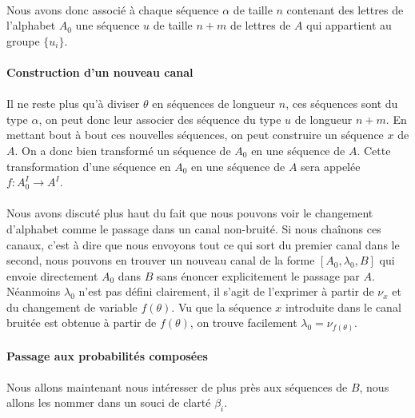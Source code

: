 	\paragraph{}
	Nous avons donc associé à chaque séquence $\alpha$ de taille $n$ contenant des lettres de l'alphabet $A_0$ une séquence $u$ de taille $n+m$ de
	lettres de $A$ qui appartient au groupe $\{u_i\}$. 
	
\paragraph{Construction d'un nouveau canal}
	
	\paragraph{}
	Il ne reste plus qu'à diviser $\theta$ en séquences de longueur $n$, ces séquences sont du type $\alpha$, on peut donc leur 
	associer des séquence du type $u$ de longueur $n+m$. En mettant bout à bout ces nouvelles séquences, on peut construire un séquence $x$ de $A$. On a donc bien transformé
	un séquence de $A_0$ en une séquence de $A$. Cette transformation d'une séquence en $A_0$ en une séquence de $A$ sera appelée $f : A_0^I \to A^I$.
	
	\paragraph{}
	Nous avons discuté plus haut du fait que nous pouvons voir le changement d'alphabet comme le passage dans un canal non-bruité. 
	Si nous chaînons ces canaux, c'est à dire que nous envoyons tout ce qui sort du premier canal dans le second,
	nous pouvons en trouver un nouveau canal de la forme $[A_0,\lambda_0,B]$ qui envoie directement $A_0$ dans $B$ 
	sans énoncer explicitement le passage par $A$. Néanmoins $\lambda_0$ n'est pas défini clairement, il s'agit de l'exprimer à partir de $\nu_x$ et
	du changement de variable $f(\theta)$. 
	Vu que la séquence $x$ introduite dans le canal bruitée est obtenue à partir de $f(\theta)$, on trouve facilement $\lambda_0=\nu_{f(\theta)}$.
	
\paragraph{Passage aux probabilités composées}
	
	\paragraph{}
	Nous allons maintenant nous intéresser de plus près aux séquences de $B$, nous allons les nommer dans un souci de clarté $\beta_i$.
	
